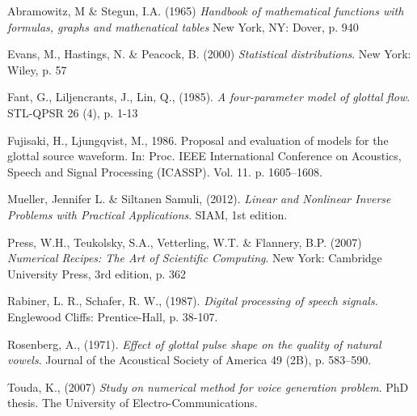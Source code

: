 \documentclass[12pt,a4]{article}
\begin{document}
\newpage
\begin{thebibliography}{9}

\begin{footnotesize}
    
    Abramowitz, M \& Stegun, I.A. (1965)
    \emph{Handbook of mathematical functions with formulas, graphs and mathenatical tables}
    New York, NY: Dover, p. 940
    
    Evans, M., Hastings, N. \& Peacock, B. (2000)
    \emph{Statistical distributions}.
    New York: Wiley, p. 57

    Fant, G., Liljencrants, J., Lin, Q., (1985).
    \emph{A four-parameter model of glottal flow}.
    STL-QPSR 26 (4), p. 1-13
    
    Fujisaki, H., Ljungqvist, M., 1986.
    Proposal and evaluation of models for the glottal source waveform.
    In: Proc. IEEE International Conference on Acoustics, Speech and Signal Processing (ICASSP). Vol. 11. p. 1605–1608.
    
	Mueller, Jennifer L. \& Siltanen Samuli, (2012).
	\emph{Linear and Nonlinear Inverse Problems with Practical Applications}.
	SIAM, 1st edition.
    
    Press, W.H., Teukolsky, S.A., Vetterling, W.T. \& Flannery, B.P. (2007)
    \emph{Numerical Recipes: The Art of Scientific Computing}.
    New York: Cambridge University Press, 3rd edition, p. 362
    
    Rabiner, L. R., Schafer, R. W., (1987).
    \emph{Digital processing of speech signals}.
    Englewood Cliffs: Prentice-Hall, p. 38-107.

    Rosenberg, A., (1971).
    \emph{Effect of glottal pulse shape on the quality of natural vowels}.
    Journal of the Acoustical Society of America 49 (2B), p. 583–590.
	
    Touda, K., (2007)
    \emph{Study on numerical method for voice generation problem}.
    PhD thesis.
    The University of Electro-Communications.


\end{footnotesize}

\end{thebibliography}
\end{document}
